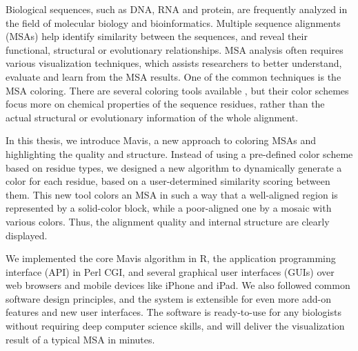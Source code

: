 Biological sequences, such as DNA, RNA and protein, are frequently analyzed in the field of molecular biology and bioinformatics. Multiple sequence alignments (MSAs) help identify similarity between the sequences, and reveal their functional, structural or evolutionary relationships. MSA analysis often requires various visualization techniques, which assists researchers to better understand, evaluate and learn from the MSA results. One of the common techniques is the MSA coloring. There are several coloring tools available \cite{Procter2010aa}, but their color schemes focus more on chemical properties of the sequence residues, rather than the actual structural or evolutionary information of the whole alignment.

In this thesis, we introduce Mavis, a new approach to coloring MSAs and highlighting the quality and structure. Instead of using a pre-defined color scheme based on residue types, we designed a new algorithm to dynamically generate a color for each residue, based on a user-determined similarity scoring between them. This new tool colors an MSA in such a way that a well-aligned region is represented by a solid-color block, while a poor-aligned one by a mosaic with various colors. Thus, the alignment quality and internal structure are clearly displayed.

We implemented the core Mavis algorithm in R, the application programming interface (API) in Perl CGI, and several graphical user interfaces (GUIs) over web browsers and mobile devices like iPhone and iPad. We also followed common software design principles, and the system is extensible for even more add-on features and new user interfaces. The software is ready-to-use for any biologists without requiring deep computer science skills, and will deliver the visualization result of a typical MSA in minutes.
